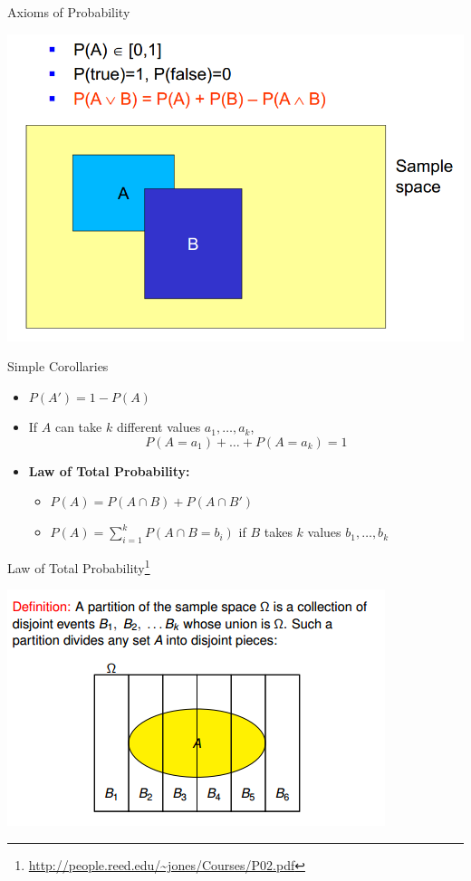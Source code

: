 \documentclass{beamer}
\newcommand{\furl}[1]{{\footnote{\url{#1}}}}
\begin{document}
\begin{frame}{Axioms of Probability}
    \begin{center}
        \includegraphics[scale=0.3]{axiomsOfProbability.png}
    \end{center}
\end{frame}

\begin{frame}{Simple Corollaries}
    \begin{itemize}
        \item $P(A') = 1 - P(A)$
        \item If $A$ can take $k$ different values $a_1, \ldots, a_k$, $$P(A=a_1) + \ldots + P(A=a_k) = 1$$
        \item {\bf Law of Total Probability:} 
        \begin{itemize}
            \item $P(A) = P(A \cap B) + P(A \cap B')$
            \item $P(A) = \sum_{i=1}^{k} P(A \cap B=b_i)$ if $B$ takes $k$ values $b_1, \ldots, b_k$
        \end{itemize}
    \end{itemize}
\end{frame}

\begin{frame}{Law of Total Probability\furl{http://people.reed.edu/~jones/Courses/P02.pdf}}
    \begin{center}
        \includegraphics[scale=0.6]{lawOfTotalProbability.png}
    \end{center}
\end{frame}
\end{document}
